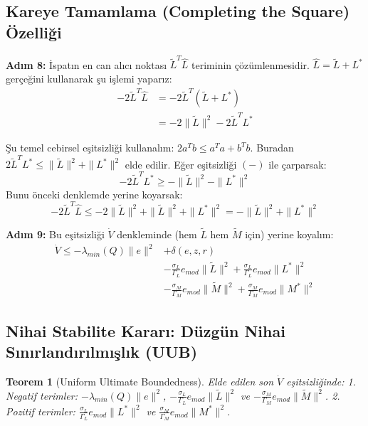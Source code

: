 \documentclass[12pt,a4paper]{article}
\newtheorem{theorem}{Teorem}
\begin{document}
\subsection{Kareye Tamamlama (Completing the Square) Özelliği}
\textbf{Adım 8:} İspatın en can alıcı noktası $\tilde{L}^T \hat{L}$ teriminin çözümlenmesidir. $\hat{L} = \tilde{L} + L^*$ gerçeğini kullanarak şu işlemi yaparız:
\begin{align}
    - 2 \tilde{L}^T \hat{L} &= - 2 \tilde{L}^T (\tilde{L} + L^*) \nonumber \\
    &= - 2 \|\tilde{L}\|^2 - 2 \tilde{L}^T L^*
\end{align}

Şu temel cebirsel eşitsizliği kullanalım: $2 a^T b \leq a^T a + b^T b$. Buradan $2 \tilde{L}^T L^* \leq \|\tilde{L}\|^2 + \|L^*\|^2$ elde edilir. Eğer eşitsizliği $(-)$ ile çarparsak:
\begin{equation}
    - 2 \tilde{L}^T L^* \geq -\|\tilde{L}\|^2 - \|L^*\|^2
\end{equation}
Bunu önceki denklemde yerine koyarsak:
\begin{equation}
    - 2 \tilde{L}^T \hat{L} \leq -2\|\tilde{L}\|^2 + \|\tilde{L}\|^2 + \|L^*\|^2 = -\|\tilde{L}\|^2 + \|L^*\|^2
\end{equation}

\textbf{Adım 9:} Bu eşitsizliği $\dot{V}$ denkleminde (hem $\tilde{L}$ hem $\tilde{M}$ için) yerine koyalım:
\begin{align}
    \dot{V} \leq - \lambda_{min}(Q) \|e\|^2 &+ \delta(e, z, r) \nonumber \\
    &- \frac{\sigma_L}{\Gamma_L} e_{mod} \|\tilde{L}\|^2 + \frac{\sigma_L}{\Gamma_L} e_{mod} \|L^*\|^2 \nonumber \\
    &- \frac{\sigma_M}{\Gamma_M} e_{mod} \|\tilde{M}\|^2 + \frac{\sigma_M}{\Gamma_M} e_{mod} \|M^*\|^2
\end{align}

\subsection{Nihai Stabilite Kararı: Düzgün Nihai Sınırlandırılmışlık (UUB)}

\begin{theorem}[Uniform Ultimate Boundedness]
Elde edilen son $\dot{V}$ eşitsizliğinde:
1. Negatif terimler: $- \lambda_{min}(Q) \|e\|^2$, $- \frac{\sigma_L}{\Gamma_L} e_{mod} \|\tilde{L}\|^2$ ve $- \frac{\sigma_M}{\Gamma_M} e_{mod} \|\tilde{M}\|^2$.
2. Pozitif terimler: $\frac{\sigma_L}{\Gamma_L} e_{mod} \|L^*\|^2$ ve $\frac{\sigma_M}{\Gamma_M} e_{mod} \|M^*\|^2$.
\end{theorem}
\end{document}
